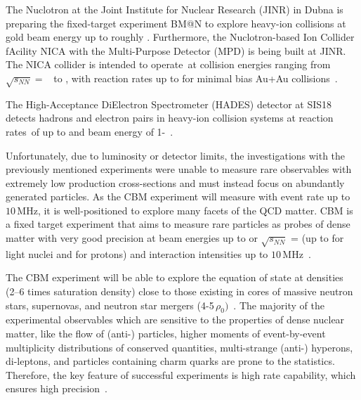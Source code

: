 The Nuclotron at the Joint Institute for Nuclear Research (JINR) in Dubna is preparing the fixed-target experiment BM@N to explore heavy-ion collisions at gold beam energy up to roughly . Furthermore, the Nuclotron-based Ion Collider fAcility NICA with the Multi-Purpose Detector (MPD) is being built at JINR. The NICA collider is intended to operate at collision energies ranging from $\sqrt{s_{NN}} =$~ to , with reaction rates up to  for minimal bias Au+Au collisions~\cite{Ablyazimov_2017}.

The High-Acceptance DiElectron Spectrometer (\gls{HADES}) detector at SIS18 detects hadrons and electron pairs in heavy-ion collision systems at reaction rates of up to  and beam energy of 1-~\cite{Ablyazimov_2017}.


Unfortunately, due to luminosity or detector limits, the investigations with the previously mentioned experiments were unable to measure rare observables with extremely low production cross-sections and must instead focus on abundantly generated particles. As the \gls{CBM} experiment will measure with event rate up to $10\,\mathrm{MHz}$, it is well-positioned to explore many facets of the \gls{QCD} matter. \gls{CBM} is a fixed target experiment that aims to measure rare particles as probes of dense matter with very good precision at beam energies up to  or $\sqrt{s_{NN}}$ =  (up to  for light nuclei and  for protons) and interaction intensities up to $10\,\mathrm{MHz}$~\cite{cbmus}.

The \gls{CBM} experiment will be able to explore the equation of state at densities (2–6 times saturation density) close to those existing in cores of massive neutron stars, supernovas, and neutron star mergers (4-5\,$\rho_{0})$~\cite{Senger_2020}. The majority of the experimental observables which are sensitive to the properties of dense nuclear matter, like the flow of (anti-) particles, higher moments of event-by-event multiplicity distributions of conserved quantities, multi-strange (anti-) hyperons, di-leptons, and particles containing charm quarks are prone to the statistics. Therefore, the key feature of successful experiments is high rate capability, which ensures high precision~\cite{Ablyazimov_2017}. 

